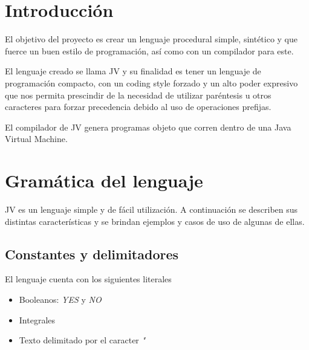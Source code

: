 \documentclass{article}
\begin{document}
    
    \clearpage
    \tableofcontents
    
    \clearpage

    \section{Introducción}
        \par El objetivo del proyecto es crear un lenguaje procedural simple, sintético y que fuerce un buen estilo de programación, así  como con un compilador para este.\\
        \par El lenguaje creado se llama JV y su finalidad es tener un lenguaje de programación compacto, con un coding style forzado y un alto poder expresivo que nos permita prescindir de la necesidad de utilizar paréntesis u otros caracteres para forzar precedencia debido al uso de operaciones prefijas.
        \par El compilador de JV genera programas objeto que corren dentro de una Java Virtual Machine.
    \clearpage


    \section{Gramática del lenguaje}

        \par JV es un lenguaje simple y de fácil utilización. A continuación se describen sus distintas características y se brindan ejemplos y casos de uso de algunas de ellas.
        \\

        \subsection{Constantes y delimitadores}

            El lenguaje cuenta con los siguientes literales
            \begin{itemize}
            \item Booleanos: \textit{YES} y \textit{NO}    
            \item Integrales
            \item Texto delimitado por el caracter \textit{"}
            \end{itemize}
\end{document}
